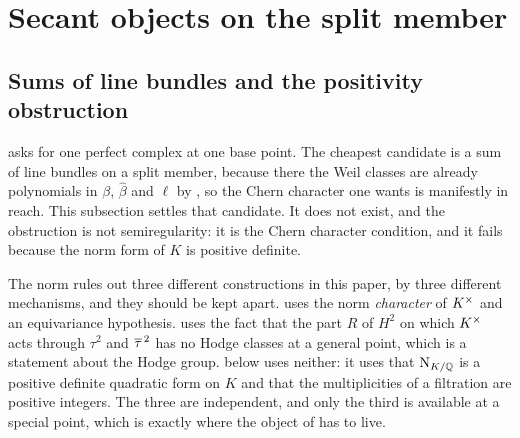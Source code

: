 \section{Secant objects on the split member}\label{sec:secantobjects}

\subsection{Sums of line bundles and the positivity obstruction}
\label{ssec:whatobject}

 asks for one perfect complex at one base point.
The cheapest candidate is a sum of line bundles on a split member, because
there the Weil classes are already polynomials in $\beta$, $\widehat\beta$ and
$\ell$ by , so the Chern character one wants is
manifestly in reach. This subsection settles that candidate. It does not
exist, and the obstruction is not semiregularity: it is the Chern character
condition, and it fails because the norm form of $K$ is positive
definite.

The norm rules out three different constructions in this paper, by three
different mechanisms, and they should be kept apart.
 uses the norm \emph{character} of $K^{\times}$ and an
equivariance hypothesis.  uses the fact that the part $R$
of $H^{2}$ on which $K^{\times}$ acts through $\tau^{2}$ and $\overline{\tau}^{\,2}$ has no
Hodge classes at a general point, which is a statement about the Hodge group.
 below uses neither: it uses that $\mathrm{N}_{K/\mathbb{Q}}$ is a
positive definite quadratic form on $K$ and that the multiplicities of a
filtration are positive integers. The three are independent, and only the
third is available at a special point, which is exactly where the object of
 has to live.

